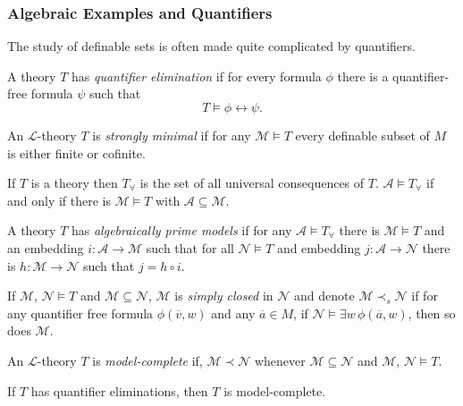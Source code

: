 \documentclass[
	fontsize=10pt, %
]{kaohandt}
\begin{document}
\subsubsection{Algebraic Examples and Quantifiers}
The study of definable sets is often made quite complicated by quantifiers.

\begin{definition}
    A theory $T$ has \emph{quantifier elimination} if for every formula $\phi$ there is a quantifier-free formula $\psi$ such that 
    \[
    T \models \phi \leftrightarrow \psi.
    \]
\end{definition}

\begin{definition}
    An $\mathcal{L}$-theory $T$ is \emph{strongly minimal} if for any $\mathcal{M} \models T$ every definable subset of $M$ is either finite or cofinite.
\end{definition}

\begin{definition}
    If $T$ is a theory then $T_{\forall}$ is the set of all universal consequences of $T$.
    $\mathcal{A} \models T_{\forall}$ if and only if there is $\mathcal{M} \models T$ with $\mathcal{A} \subseteq \mathcal{M}$.

    A theory $T$ has \emph{algebraically prime models}
    if for any $\mathcal{A} \models T_{\forall}$ there is 
    $\mathcal{M} \models T$ and an embedding $i:\mathcal{A} \to \mathcal{M}$ such that for all $\mathcal{N} \models T$ and embedding $j: \mathcal{A} \to \mathcal{N}$ there is $h: \mathcal{M} \to \mathcal{N}$ such that $j = h \circ i$.

    If $\mathcal{M}$, $\mathcal{N} \models T$ and $\mathcal{M} \subseteq \mathcal{N}$,
    $\mathcal{M}$ is \emph{simply closed} in $\mathcal{N}$ and denote
    $\mathcal{M} \prec_s \mathcal{N}$ if for any quantifier free formula
    $\phi(\overline{v},w)$ and any $\overline{a} \in M$,
    if $\mathcal{N} \models \exists w\, \phi(\overline{a},w)$,
    then so does $\mathcal{M}$.
\end{definition}

\begin{definition}
    An $\mathcal{L}$-theory $T$ is \emph{model-complete} if, 
    $\mathcal{M} \prec \mathcal{N}$ whenever
    $\mathcal{M} \subseteq \mathcal{N}$  and $\mathcal{M}$, $\mathcal{N} \models T$.
\end{definition}

\begin{proposition}
    If $T$ has quantifier eliminations,
    then $T$ is model-complete.
\end{proposition}
\end{document}
